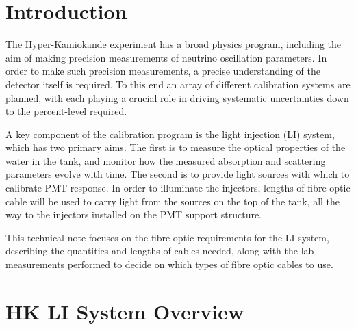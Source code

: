 \documentclass[a4paper,11pt]{article}
\begin{document}
\clearpage
\newpage

\section{Introduction}\label{sec:intro}
The Hyper-Kamiokande experiment has a broad physics program, including the aim of making precision measurements of neutrino oscillation parameters. In order to make such precision measurements, a precise understanding of the detector itself is required. To this end an array of different calibration systems are planned, with each playing a crucial role in driving systematic uncertainties down to the percent-level required.

A key component of the calibration program is the light injection (LI) system, which has two primary aims. The first is to measure the optical properties of the water in the tank, and monitor how the measured absorption and scattering parameters evolve with time. The second is to provide light sources with which to calibrate PMT response. In order to illuminate the injectors, lengths of fibre optic cable will be used to carry light from the sources on the top of the tank, all the way to the injectors installed on the PMT support structure.

This technical note focuses on the fibre optic requirements for the LI system, describing the quantities and lengths of cables needed, along with the lab measurements performed to decide on which types of fibre optic cables to use.

\section{HK LI System Overview}\label{sec:overview}
\end{document}
